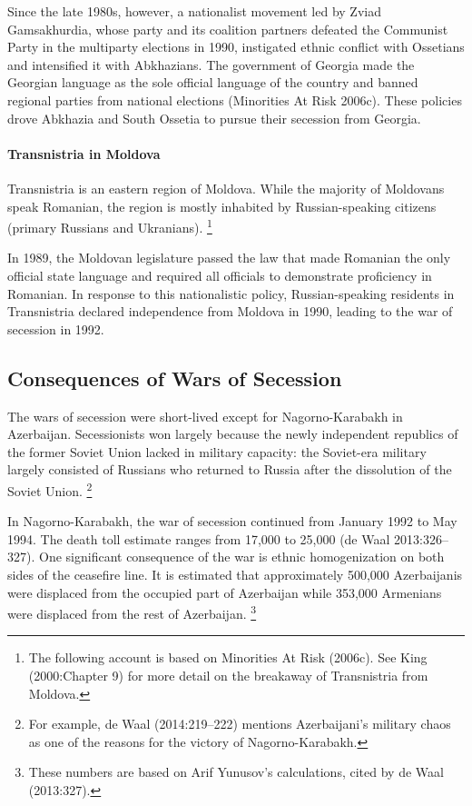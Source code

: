 \documentclass[12pt,a4paper]{article}%
\begin{document}
Since the late 1980s, however, a nationalist movement led by Zviad Gamsakhurdia, whose party and its coalition partners defeated the Communist Party in the multiparty elections in 1990, instigated ethnic conflict with Ossetians and intensified it with Abkhazians.
The government of Georgia made the Georgian language as the sole official language of the country and banned regional parties from national elections (Minorities At Risk 2006c).
These policies drove Abkhazia and South Ossetia to pursue their secession from Georgia.

\paragraph{Transnistria in Moldova}
Transnistria is an eastern region of Moldova. While the majority of Moldovans speak Romanian, the region is mostly inhabited by Russian-speaking citizens (primary Russians and Ukranians).%
\footnote{
	The following account is based on Minorities At Risk (2006c). See King (2000:Chapter 9) for more detail on the breakaway of Transnistria from Moldova.
} 

In 1989, the Moldovan legislature passed the law that made Romanian the only official state language and required all officials to demonstrate proficiency in Romanian. 
In response to this nationalistic policy, Russian-speaking residents in Transnistria declared independence from Moldova in 1990, leading to the war of secession in 1992.%
\subsection{Consequences of Wars of Secession}
The wars of secession were short-lived except for Nagorno-Karabakh in Azerbaijan. 
Secessionists won largely because the newly independent republics of the former Soviet Union lacked in military capacity: the Soviet-era military largely consisted of Russians who returned to Russia after the dissolution of the Soviet Union.%
\footnote{
	For example, de Waal (2014:219--222) mentions Azerbaijani's military chaos as one of the reasons for the victory of Nagorno-Karabakh.
}

In Nagorno-Karabakh, the war of secession continued from January 1992 to May 1994. The death toll estimate ranges from 17,000 to 25,000 (de Waal 2013:326--327). One significant consequence of the war is ethnic homogenization on both sides of the ceasefire line. 
It is estimated that approximately 500,000 Azerbaijanis were displaced from the occupied part of Azerbaijan while 353,000 Armenians were displaced from the rest of Azerbaijan.%
\footnote{
	These numbers are based on Arif Yunusov's calculations, cited by de Waal (2013:327).
}
\end{document}
